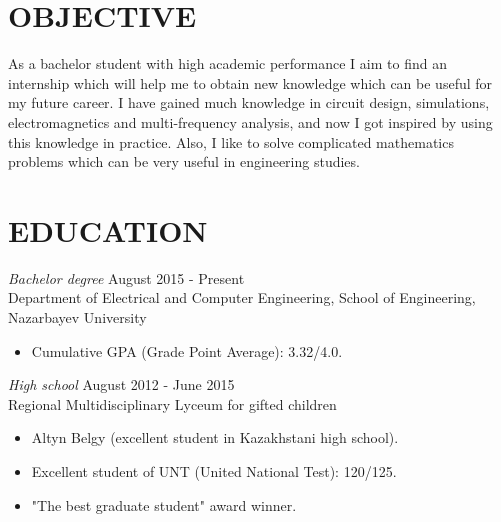\documentclass[margin, 10pt]{res} %
\begin{document}
\begin{resume}

 
\section{OBJECTIVE}  

As a bachelor student with high academic performance I aim to find an internship which will help me to obtain new knowledge which can be useful for my future career. I have gained much knowledge in circuit design, simulations, electromagnetics and multi-frequency analysis, and now I got inspired by using this knowledge in practice. Also, I like to solve complicated mathematics problems which can be very useful in engineering studies.


\section{EDUCATION}

{\sl Bachelor degree} \hfill August 2015 - Present \\
Department of Electrical and Computer Engineering, School of Engineering, Nazarbayev University
\begin{itemize}
\item Cumulative GPA (Grade Point Average): 3.32/4.0.
\end{itemize} 

{\sl High school} \hfill August 2012 - June 2015 \\
Regional Multidisciplinary Lyceum for gifted children
\begin{itemize}
\item Altyn Belgy (excellent student in Kazakhstani high school).
\item Excellent student of UNT (United National Test): 120/125.
\item "The best graduate student" award winner.
\end{itemize} 

 

\end{resume}
\end{document}
